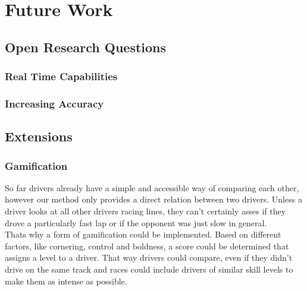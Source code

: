 \section{Future Work}
\label{sec:future_work}

\subsection{Open Research Questions}
\subsubsection{Real Time Capabilities}
\subsubsection{Increasing Accuracy}

\subsection{Extensions}
\subsubsection{Gamification}
So far drivers already have a simple and accessible way of comparing each other, however our method only provides a direct relation between two drivers. Unless a driver looks at all other drivers racing lines, they can't certainly asses if they drove a particularly fast lap or if the opponent was just slow in general.\\
Thats why a form of gamification could be implemented. Based on different factors, like cornering, control and boldness, a score could be determined that assigns a level to a driver. That way drivers could compare, even if they didn't drive on the same track and races could include drivers of similar skill levels to make them as intense as possible.

